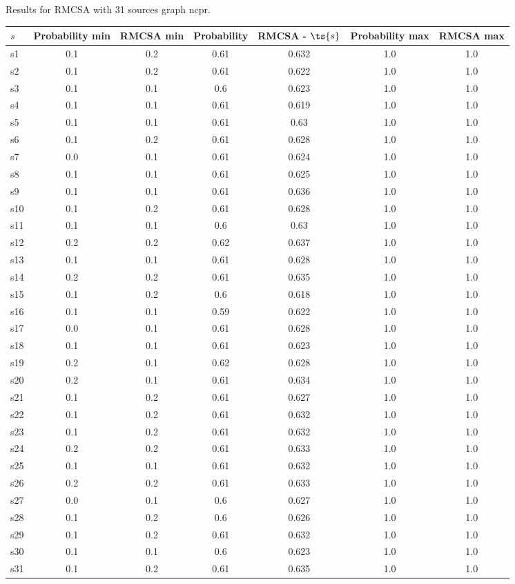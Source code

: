 \documentclass{article}
\begin{document}
\noindent Results for RMCSA with 31 sources graph ncpr.

\noindent\begin{tabular}{|l|c|c|c|c|c|c|}
\hline
$s$& Probability min & RMCSA min & Probability & RMCSA - $\ts{s}$ & Probability max & RMCSA max\\
\hline
s1 &0.1 & 0.2 & 0.61 & 0.632 & 1.0 & 1.0\\
\hline
s2 &0.1 & 0.2 & 0.61 & 0.622 & 1.0 & 1.0\\
\hline
s3 &0.1 & 0.1 & 0.6 & 0.623 & 1.0 & 1.0\\
\hline
s4 &0.1 & 0.1 & 0.61 & 0.619 & 1.0 & 1.0\\
\hline
s5 &0.1 & 0.1 & 0.61 & 0.63 & 1.0 & 1.0\\
\hline
s6 &0.1 & 0.2 & 0.61 & 0.628 & 1.0 & 1.0\\
\hline
s7 &0.0 & 0.1 & 0.61 & 0.624 & 1.0 & 1.0\\
\hline
s8 &0.1 & 0.1 & 0.61 & 0.625 & 1.0 & 1.0\\
\hline
s9 &0.1 & 0.1 & 0.61 & 0.636 & 1.0 & 1.0\\
\hline
s10 &0.1 & 0.2 & 0.61 & 0.628 & 1.0 & 1.0\\
\hline
s11 &0.1 & 0.1 & 0.6 & 0.63 & 1.0 & 1.0\\
\hline
s12 &0.2 & 0.2 & 0.62 & 0.637 & 1.0 & 1.0\\
\hline
s13 &0.1 & 0.1 & 0.61 & 0.628 & 1.0 & 1.0\\
\hline
s14 &0.2 & 0.2 & 0.61 & 0.635 & 1.0 & 1.0\\
\hline
s15 &0.1 & 0.2 & 0.6 & 0.618 & 1.0 & 1.0\\
\hline
s16 &0.1 & 0.1 & 0.59 & 0.622 & 1.0 & 1.0\\
\hline
s17 &0.0 & 0.1 & 0.61 & 0.628 & 1.0 & 1.0\\
\hline
s18 &0.1 & 0.1 & 0.61 & 0.623 & 1.0 & 1.0\\
\hline
s19 &0.2 & 0.1 & 0.62 & 0.628 & 1.0 & 1.0\\
\hline
s20 &0.2 & 0.1 & 0.61 & 0.634 & 1.0 & 1.0\\
\hline
s21 &0.1 & 0.2 & 0.61 & 0.627 & 1.0 & 1.0\\
\hline
s22 &0.1 & 0.2 & 0.61 & 0.632 & 1.0 & 1.0\\
\hline
s23 &0.1 & 0.2 & 0.61 & 0.632 & 1.0 & 1.0\\
\hline
s24 &0.2 & 0.2 & 0.61 & 0.633 & 1.0 & 1.0\\
\hline
s25 &0.1 & 0.1 & 0.61 & 0.632 & 1.0 & 1.0\\
\hline
s26 &0.2 & 0.2 & 0.61 & 0.633 & 1.0 & 1.0\\
\hline
s27 &0.0 & 0.1 & 0.6 & 0.627 & 1.0 & 1.0\\
\hline
s28 &0.1 & 0.2 & 0.6 & 0.626 & 1.0 & 1.0\\
\hline
s29 &0.1 & 0.2 & 0.61 & 0.632 & 1.0 & 1.0\\
\hline
s30 &0.1 & 0.1 & 0.6 & 0.623 & 1.0 & 1.0\\
\hline
s31 &0.1 & 0.2 & 0.61 & 0.635 & 1.0 & 1.0\\
\hline
\end{tabular}\\
\end{document}
